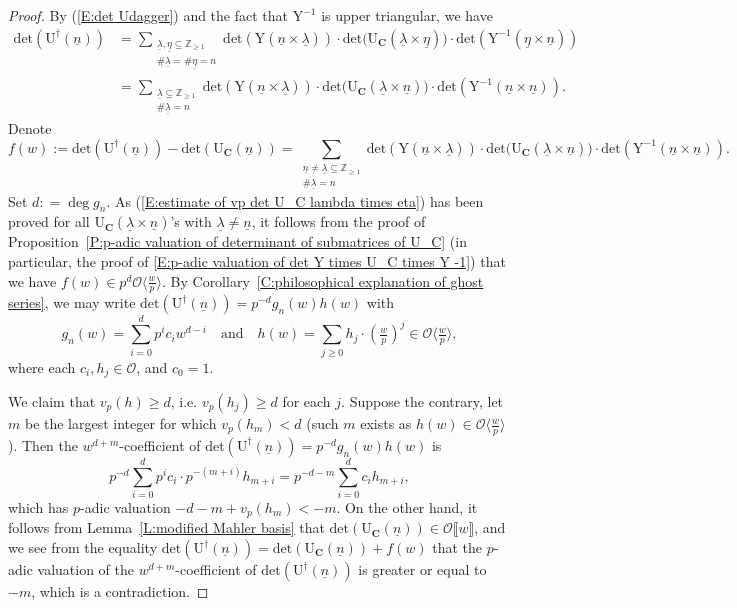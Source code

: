 \documentclass[12pt]{amsart}
\theoremstyle{definition}
\numberwithin{equation}{subsection}
\def\calO{\mathcal{O}}
\def\ZZ{\mathbb{Z}}
\def\bfC{\mathbf{C}}
\def\rmU{\mathrm{U}}
\def\rmY{\mathrm{Y}}
\renewcommand{\det}{\mathrm{det}}
\begin{document}
\begin{proof}
By (\ref{E:det Udagger}) and the fact that $\rmY^{-1}$ is upper triangular, we have 
	\begin{align*}
		\det(\rmU^\dagger(\underline n))&= \sum_{\substack{\underline \lambda, \underline \eta \subseteq \ZZ_{\geq 1}\\ \#\underline \lambda= \# \underline \eta = n}}  \det(\rmY(\underline n \times \underline \lambda))  \cdot \det \big(\rmU_{\bfC}(\underline \lambda \times \underline \eta) \big) \cdot \det (\rmY^{-1}(\underline \eta\times \underline n))\\
&=\sum_{\substack{\underline \lambda \subseteq \ZZ_{\geq 1}\\\# \underline \lambda = n}}  \det(\rmY(\underline n\times \underline \lambda))  \cdot \det \big(\rmU_{\bfC}(\underline \lambda \times \underline n) \big) \cdot \det (\rmY^{-1}(\underline n\times \underline n)).
	\end{align*}
    Denote
    \[
f(w):=\det(\rmU^\dagger(\underline n))-\det(\rmU_\bfC(\underline n))=\sum_{\substack{\underline n\neq \underline \lambda \subseteq \ZZ_{\geq 1}\\ \# \underline \lambda = n}}  \det(\rmY(\underline n\times \underline \lambda))  \cdot \det \big(\rmU_{\bfC}(\underline \lambda \times \underline n) \big) \cdot \det (\rmY^{-1}(\underline n\times \underline n)).
    \]
Set $d: =\deg g_n$.	    
As  (\ref{E:estimate of vp det U_C lambda times eta}) has been proved for all $\rmU_\bfC(\underline\lambda\times \underline n)$'s with $\underline\lambda \neq \underline n$, it follows from the proof of Proposition~\ref{P:p-adic valuation of determinant of submatrices of U_C} (in particular, the proof of \eqref{E:p-adic valuation of det Y times U_C times Y -1}) that we have $f(w)\in p^d\calO\langle \frac wp\rangle$. By Corollary~\ref{C:philosophical explanation of ghost series}, we may write $\det(\rmU^\dagger(\underline n))=p^{-d}g_n(w)h(w)$ with
$$
g_n(w) =\sum_{i=0}^d p^ic_iw^{d-i} \quad \textrm{and} \quad h(w)=\sum\limits_{j\geq 0}h_j\cdot (\tfrac wp)^j\in \calO\langle \tfrac wp\rangle,
$$
where each $c_i, h_j\in \calO$, and $c_0=1$. 

We claim that $v_p(h) \geq d$, i.e. $v_p(h_j) \geq d$ for each $j$. Suppose the contrary, let $m$ be the largest integer for which $v_p(h_m) <d$ (such $m$ exists as $h(w)\in  \calO\langle \frac wp\rangle$). Then the $w^{d+m}$-coefficient of $\det(\rmU^\dagger(\underline n))=p^{-d}g_n(w)h(w)$ is 
$$p^{-d}\sum_{i=0}^d p^ic_i\cdot p^{-(m+i)} h_{m+i} = p^{-d-m}\sum_{i=0}^d c_i h_{m+i},
$$
which has $p$-adic valuation $-d-m+v_p(h_m)<-m$. On the other hand, it follows from Lemma~\ref{L:modified Mahler basis} that $\det(\rmU_\bfC(\underline n))\in \calO\llbracket w\rrbracket$, and we see from the equality $\det(\rmU^\dagger(\underline n))=\det(\rmU_\bfC(\underline n))+f(w)$ that the $p$-adic valuation of the $w^{d+m}$-coefficient of $\det(\rmU^\dagger(\underline n))$ is greater or equal to $-m$, which is a contradiction. 


\end{proof}
\end{document}
